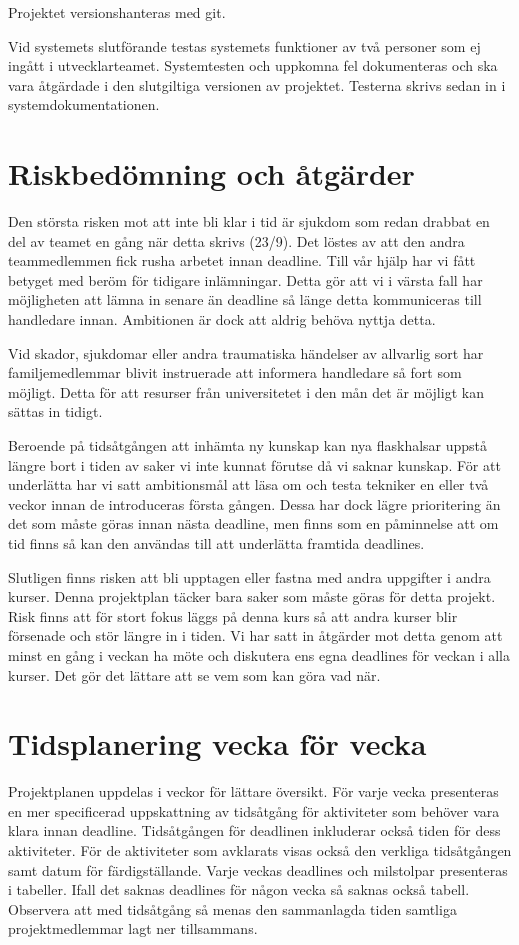 \documentclass{TDP003mall}
\begin{document}
Projektet versionshanteras med git.

Vid systemets slutförande testas systemets funktioner av två personer som ej ingått i utvecklarteamet.
Systemtesten och uppkomna fel dokumenteras och ska vara åtgärdade i den slutgiltiga versionen av projektet.
Testerna skrivs sedan in i systemdokumentationen.

\section{Riskbedömning och åtgärder}
Den största risken mot att inte bli klar i tid är sjukdom som redan drabbat en del av teamet en gång när detta skrivs (23/9). Det löstes av att den andra teammedlemmen fick rusha arbetet innan deadline. Till vår hjälp har vi fått betyget med beröm för tidigare inlämningar. Detta gör att vi i värsta fall har möjligheten att lämna in senare än deadline så länge detta kommuniceras till handledare innan. Ambitionen är dock att aldrig behöva nyttja detta.

Vid skador, sjukdomar eller andra traumatiska händelser av allvarlig sort har familjemedlemmar blivit instruerade att informera handledare så fort som möjligt. Detta för att resurser från universitetet i den mån det är möjligt kan sättas in tidigt.

Beroende på tidsåtgången att inhämta ny kunskap kan nya flaskhalsar uppstå längre bort i tiden av saker vi inte kunnat förutse då vi saknar kunskap. För att underlätta har vi satt ambitionsmål att läsa om och testa tekniker en eller två veckor innan de introduceras första gången. Dessa har dock lägre prioritering än det som måste göras innan nästa deadline, men finns som en påminnelse att om tid finns så kan den användas till att underlätta framtida deadlines.

Slutligen finns risken att bli upptagen eller fastna med andra uppgifter i andra kurser. Denna projektplan täcker bara saker som måste göras för detta projekt. Risk finns att för stort fokus läggs på denna kurs så att andra kurser blir försenade och stör längre in i tiden. Vi har satt in åtgärder mot detta genom att minst en gång i veckan ha möte och diskutera ens egna deadlines för veckan i alla kurser. Det gör det lättare att se vem som kan göra vad när.

\section{Tidsplanering vecka för vecka}
Projektplanen uppdelas i veckor för lättare översikt. För varje vecka presenteras
 en mer specificerad uppskattning av tidsåtgång för aktiviteter som behöver vara
 klara innan deadline. Tidsåtgången för deadlinen inkluderar också tiden för dess
 aktiviteter. För de aktiviteter som avklarats visas också den verkliga tidsåtgången
 samt datum för färdigställande. Varje veckas deadlines och milstolpar presenteras
 i tabeller. Ifall det saknas deadlines för någon vecka så saknas också tabell. Observera att med tidsåtgång så menas den sammanlagda tiden samtliga projektmedlemmar lagt ner tillsammans.
\end{document}
